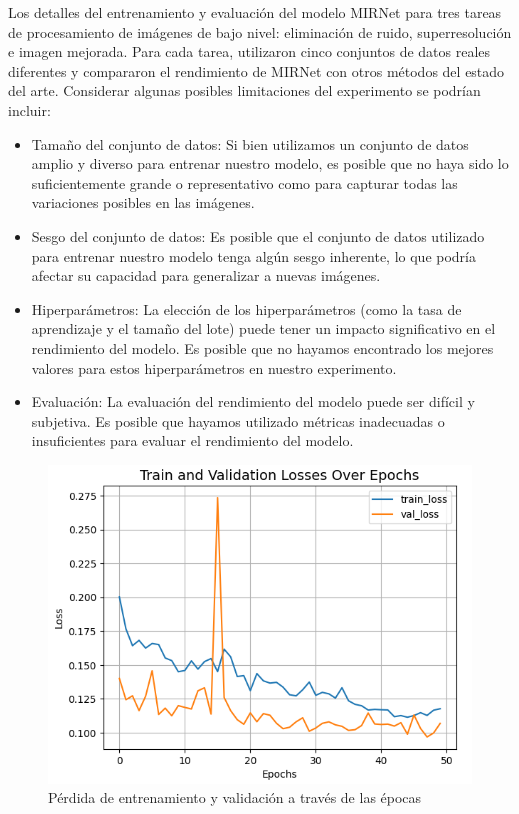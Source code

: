\documentclass[a4paper,
               ]{jacow}
\begin{document}
Los detalles del entrenamiento y evaluación del modelo MIRNet para tres tareas de procesamiento de imágenes de bajo nivel: eliminación de ruido, superresolución e imagen mejorada. Para cada tarea, utilizaron cinco conjuntos de datos reales diferentes y compararon el rendimiento de MIRNet con otros métodos del estado del arte. Considerar algunas posibles limitaciones del experimento se podrían incluir:

\begin{itemize}[label=-]
  \item Tamaño del conjunto de datos: Si bien utilizamos un conjunto de datos amplio y diverso para entrenar nuestro modelo, es posible que no haya sido lo suficientemente grande o representativo como para capturar todas las variaciones posibles en las imágenes.
  \item Sesgo del conjunto de datos: Es posible que el conjunto de datos utilizado para entrenar nuestro modelo tenga algún sesgo inherente, lo que podría afectar su capacidad para generalizar a nuevas imágenes.
  \item Hiperparámetros: La elección de los hiperparámetros (como la tasa de aprendizaje y el tamaño del lote) puede tener un impacto significativo en el rendimiento del modelo. Es posible que no hayamos encontrado los mejores valores para estos hiperparámetros en nuestro experimento.
  \item Evaluación: La evaluación del rendimiento del modelo puede ser difícil y subjetiva. Es posible que hayamos utilizado métricas inadecuadas o insuficientes para evaluar el rendimiento del modelo.
\end{itemize}



\begin{figure}[!h]
    \centering
    \includegraphics*[width=.5\textwidth]{ll-train-losses-ep}
    \caption{Pérdida de entrenamiento y validación a través de las épocas}
    \label{fig:ll_train_losses_ep}
\end{figure}
\end{document}
